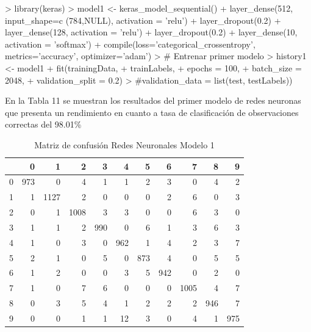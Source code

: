 \documentclass{article}
\begin{document}
\begin{Schunk}
\begin{Sinput}
> library(keras)
> model1 <- keras_model_sequential() %
+   layer_dense(512, input_shape=c (784,NULL), activation = 'relu') %
+   layer_dropout(0.2) %
+   layer_dense(128, activation = 'relu') %
+   layer_dropout(0.2) %
+   layer_dense(10, activation = 'softmax') %
+   compile(loss='categorical_crossentropy', metrics='accuracy', optimizer='adam')
> # Entrenar primer modelo
> history1 <- model1 %
+   fit(trainingData,
+       trainLabels,
+       epochs = 100,
+       batch_size = 2048,
+       validation_split = 0.2)
> #validation_data = list(test, testLabels))
\end{Sinput}
\end{Schunk}


En la Tabla 11 se muestran los resultados del primer modelo de redes neuronas que presenta un rendimiento en cuanto a tasa de clasificación de observaciones correctas del 98.01\%

\begin{table}[H]
\caption{\small{Matriz de confusión Redes Neuronales Modelo 1}}
\centering
\begin{tabular}{rrrrrrrrrrr}
  \hline
 & 0 & 1 & 2 & 3 & 4 & 5 & 6 & 7 & 8 & 9 \\ 
  \hline
0 & 973 &   0 &   4 &   1 &   1 &   2 &   3 &   0 &   4 &   2 \\ 
  1 &   1 & 1127 &   2 &   0 &   0 &   0 &   2 &   6 &   0 &   3 \\ 
  2 &   0 &   1 & 1008 &   3 &   3 &   0 &   0 &   6 &   3 &   0 \\ 
  3 &   1 &   1 &   2 & 990 &   0 &   6 &   1 &   3 &   6 &   3 \\ 
  4 &   1 &   0 &   3 &   0 & 962 &   1 &   4 &   2 &   3 &   7 \\ 
  5 &   2 &   1 &   0 &   5 &   0 & 873 &   4 &   0 &   5 &   5 \\ 
  6 &   1 &   2 &   0 &   0 &   3 &   5 & 942 &   0 &   2 &   0 \\ 
  7 &   1 &   0 &   7 &   6 &   0 &   0 &   0 & 1005 &   4 &   7 \\ 
  8 &   0 &   3 &   5 &   4 &   1 &   2 &   2 &   2 & 946 &   7 \\ 
  9 &   0 &   0 &   1 &   1 &  12 &   3 &   0 &   4 &   1 & 975 \\ 
   \hline
\end{tabular}
\end{table}
\end{document}
